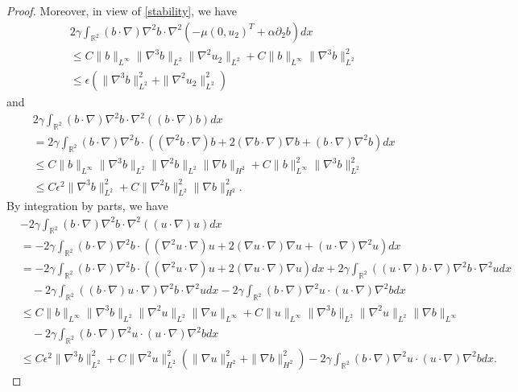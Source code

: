\documentclass[reqno,11pt]{amsart}
\def\R{\mathbb R}
\numberwithin{Thm}{section}
\begin{document}
\begin{proof}
Moreover, in view of \eqref{stability}, we have
\begin{align}\label{K-2}
&2\gamma\int_{\R^2}(b\cdot\nabla) \nabla^2 b\cdot\nabla^2(-\mu (0,u_2)^{T}  +\alpha\partial_2 b)dx
\nonumber\\&\leq
C\|b\|_{L^\infty}\|\nabla^3 b\|_{L^2}\|\nabla^2 u_2\|_{L^2}+C\|b\|_{L^\infty}\|\nabla^3 b\|_{L^2}^2\nonumber\\
&\leq \epsilon\left(\|\nabla^3 b\|_{L^2}^2+\|\nabla^2 u_2\|_{L^2}^2\right)
\end{align}
and
\begin{align}\label{K-21}
&2\gamma\int_{\R^2}(b\cdot\nabla) \nabla^2 b\cdot\nabla^2((b \cdot \nabla) b)dx\nonumber\\
&=2\gamma\int_{\R^2}(b\cdot\nabla)\nabla^2 b\cdot((\nabla^2b \cdot \nabla) b+2(\nabla b \cdot \nabla)\nabla b+(b \cdot \nabla)\nabla^2 b)dx\nonumber\\
&
\leq
C\|b\|_{L^\infty}\|\nabla^3 b\|_{L^2}\|\nabla^2 b\|_{L^2}\|\nabla b\|_{H^2}+C\|b\|_{L^\infty}^2\|\nabla^3 b\|_{L^2}^2\nonumber\\
&\leq C\epsilon^2\|\nabla^3 b\|_{L^2}^2+C\|\nabla^2 b\|_{L^2}^2\|\nabla b\|_{H^2}^2.
\end{align}
By integration by parts, we have
\begin{align}\label{K-3}
&-2\gamma\int_{\R^2}(b\cdot\nabla)\nabla^2 b\cdot\nabla^2( (u \cdot \nabla) u)dx
\nonumber\\
&=-2\gamma\int_{\R^2}(b\cdot\nabla)\nabla^2 b\cdot((\nabla^2u \cdot \nabla) u+2(\nabla u \cdot \nabla)\nabla u+(u \cdot \nabla)\nabla^2 u)dx\nonumber\\
&=-2\gamma\int_{\R^2}(b\cdot\nabla)\nabla^2 b\cdot((\nabla^2u \cdot \nabla) u+2(\nabla u \cdot \nabla)\nabla u)dx+2\gamma\int_{\R^2}((u\cdot\nabla) b\cdot\nabla)\nabla^2b \cdot \nabla^2 udx\nonumber\\
&\quad-2\gamma\int_{\R^2}((b\cdot\nabla)u\cdot\nabla)\nabla^2 b\cdot\nabla^2udx-2\gamma\int_{\R^2}(b\cdot\nabla)\nabla^2 u\cdot(u \cdot \nabla)\nabla^2 bdx\nonumber\\
&\leq
C\|b\|_{L^\infty}\|\nabla^3 b\|_{L^2}\|\nabla^2 u\|_{L^2}\|\nabla u\|_{L^{\infty}}+
C\|u\|_{L^\infty}\|\nabla^3 b\|_{L^2}\|\nabla^2 u\|_{L^2}\|\nabla b\|_{L^{\infty}}\nonumber\\
&\quad-2\gamma\int_{\R^2}(b\cdot\nabla)\nabla^2 u\cdot(u \cdot \nabla)\nabla^2 bdx\nonumber\\
&\leq C\epsilon^2\|\nabla^3b\|_{L^2}^2+C\|\nabla^2 u\|_{L^2}^2\left(\|\nabla u\|_{H^2}^2+\|\nabla b\|_{H^2}^2\right)-2\gamma\int_{\R^2}(b\cdot\nabla)\nabla^2 u\cdot(u \cdot \nabla)\nabla^2 bdx.
\end{align}


\end{proof}
\end{document}
